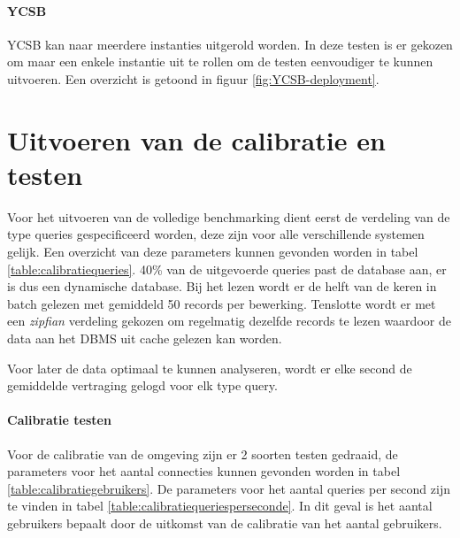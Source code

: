 \paragraph{YCSB} YCSB kan naar meerdere instanties uitgerold worden. In deze testen is er gekozen om maar een enkele instantie uit te rollen om de testen eenvoudiger te kunnen uitvoeren.  Een overzicht is getoond in figuur \ref{fig:YCSB-deployment}. 


\section{Uitvoeren van de calibratie en testen}
Voor het uitvoeren van de volledige benchmarking dient eerst de verdeling van de type queries gespecificeerd worden, deze zijn voor alle verschillende systemen gelijk. Een overzicht van deze parameters kunnen gevonden worden in tabel \ref{table:calibratiequeries}. 40\% van de uitgevoerde queries past de database aan, er is dus een dynamische database. Bij het lezen wordt er de helft van de keren in batch gelezen met gemiddeld 50 records per bewerking. Tenslotte wordt er met een \textit{zipfian} verdeling gekozen om regelmatig dezelfde records te lezen waardoor de data aan het DBMS uit cache gelezen kan worden. 

Voor later de data optimaal te kunnen analyseren, wordt er elke second de gemiddelde vertraging gelogd voor elk type query. 

\paragraph{Calibratie testen} Voor de calibratie van de omgeving zijn er 2 soorten testen gedraaid, de parameters voor het aantal connecties kunnen gevonden worden in tabel \ref{table:calibratiegebruikers}. De parameters voor het aantal queries per second zijn te vinden in tabel \ref{table:calibratiequeriesperseconde}. In dit geval is het aantal gebruikers bepaalt door de uitkomst van de calibratie van het aantal gebruikers. 

